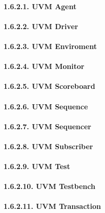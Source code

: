 \documentclass[]{article}
\let\oldparagraph\paragraph
\renewcommand{\paragraph}[1]{\oldparagraph{#1}\mbox{}}
\begin{document}
\paragraph{1.6.2.1. UVM Agent}\label{uvm-agent}

\paragraph{1.6.2.2. UVM Driver}\label{uvm-driver}

\paragraph{1.6.2.3. UVM Enviroment}\label{uvm-enviroment}

\paragraph{1.6.2.4. UVM Monitor}\label{uvm-monitor}

\paragraph{1.6.2.5. UVM Scoreboard}\label{uvm-scoreboard}

\paragraph{1.6.2.6. UVM Sequence}\label{uvm-sequence}

\paragraph{1.6.2.7. UVM Sequencer}\label{uvm-sequencer}

\paragraph{1.6.2.8. UVM Subscriber}\label{uvm-subscriber}

\paragraph{1.6.2.9. UVM Test}\label{uvm-test}

\paragraph{1.6.2.10. UVM Testbench}\label{uvm-testbench}

\paragraph{1.6.2.11. UVM Transaction}\label{uvm-transaction}
\end{document}

